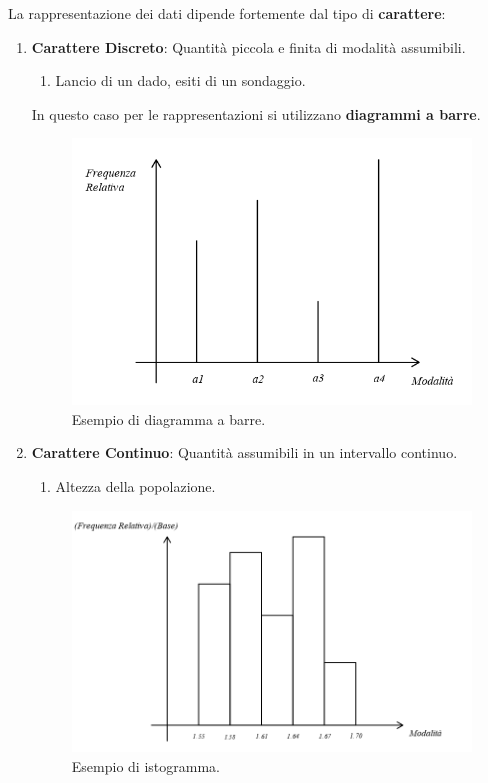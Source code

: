 \documentclass{article}
\begin{document}
La rappresentazione dei dati dipende fortemente dal tipo di \textbf{carattere}:
\vspace*{10px}
\begin{enumerate}
    \item \textbf{Carattere Discreto}: Quantità piccola e finita di modalità assumibili.
    \begin{enumerate}
        \item Lancio di un dado, esiti di un sondaggio.
    \end{enumerate}

\newpage

In questo caso per le rappresentazioni si utilizzano \textbf{diagrammi a barre}.

\begin{figure}[htbp]
    \center
    \includegraphics[scale=0.6]{img/diagramma_a_barre.png}
    \caption{Esempio di diagramma a barre.}
\end{figure}

\item \textbf{Carattere Continuo}: Quantità assumibili in un intervallo continuo.
\begin{enumerate}
    \item Altezza della popolazione.
\end{enumerate}

\begin{figure}[htbp]
    \center
    \includegraphics[scale=0.5]{img/istogramma.png}
    \caption{Esempio di istogramma.}
\end{figure}


\end{enumerate}
\end{document}
